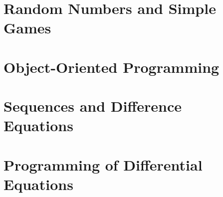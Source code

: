 \chapter{Random Numbers and Simple Games}

\chapter{Object-Oriented Programming}


\appendix
\chapter{Sequences and Difference Equations}


\addtocounter{chapter}{3}
\chapter{Programming of Differential Equations}



\printbibliography
